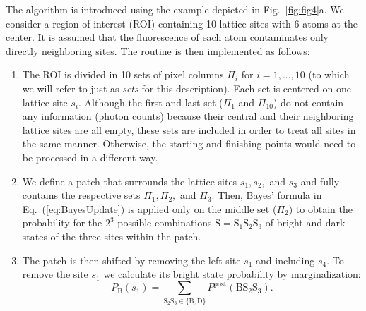 \documentclass[aps,prl,twocolumn,english,showpacs]{revtex4-1}
\begin{document}
The algorithm is introduced using the example depicted in Fig.~\ref{fig:fig4}a. We consider a region of interest (ROI) containing 10 lattice sites with 6 atoms at the center. It is assumed that the fluorescence of each atom contaminates only directly neighboring sites. The routine is then implemented as follows: 

\begin{enumerate}[leftmargin=0.5cm]

\item The ROI is divided in 10 sets of pixel columns $\Pi_i$ for $i=1,...,10$ (to which we will refer to just as \emph{sets} for this description).  Each set is centered on one lattice site $s_{i}$. Although the first and last set ($\Pi_1$ and $\Pi_{10}$) do not contain any information (photon counts) because their central and their neighboring lattice sites are all empty, these sets are included in order to treat all sites in the same manner. Otherwise, the starting and finishing points would need to be processed in a different way.

\item We define a patch that surrounds the lattice sites $s_{1},s_{2},$ and $s_{3}$ and fully contains the respective sets $\Pi_{1},\Pi_{2},$ and $\Pi_{3}$. Then, Bayes' formula in Eq.~(\ref{eq:BayesUpdate}) is applied only on the middle set ($\Pi_2$) to obtain the probability for the $2^3$ possible combinations $\text{S} = \text{S}_1 \text{S}_2 \text{S}_3$ of bright and dark states of the three sites within the patch. 

\item  The patch is then shifted by removing the left site $s_1$ and including  $s_4$. To remove the site $s_1$ we calculate its bright state probability by marginalization:
\begin{equation}
P_{\text{B}}(s_{1}) =\sum_{\text{S}_{2}\text{S}_{3}\in \{\text{B},\text{D}\}}P^{\text{post}}\left( \text{BS}_{2}\text{S}_{3}\right).
\end{equation}


\end{enumerate}
\end{document}
